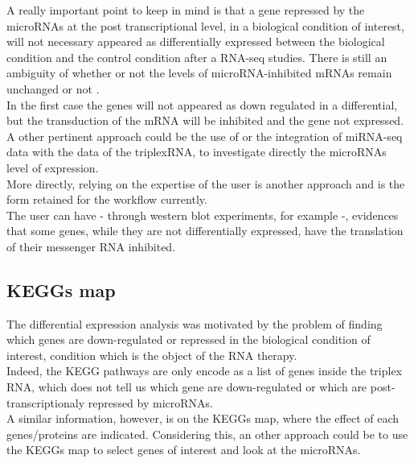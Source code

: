 \documentclass[a4paper,12pt]{report}
\begin{document}
A really important point to keep in mind is that a gene repressed by the microRNAs at the post transcriptional level, in a biological condition of interest, will not necessary appeared as differentially expressed between the biological condition and the control condition after a RNA-seq studies. There is still an ambiguity of whether or not the levels of microRNA-inhibited mRNAs remain unchanged or not \cite{cancer}.\\

In the first case the genes will not appeared as down regulated in a differential, but the transduction of the mRNA will be inhibited and the gene not expressed.\\

A other pertinent approach could be the use of or the integration of miRNA-seq data with the data of the triplexRNA, to investigate directly the microRNAs level of expression.\\
 
More directly, relying on the expertise of the user is another approach and is the form retained for the workflow currently. \\

The user can have - through western blot experiments, for example -, evidences that some genes, while they are not differentially expressed, have the translation of their messenger RNA inhibited.\\

\subsection{KEGGs map}

The differential expression analysis was motivated by the problem of finding which genes are down-regulated or repressed in the biological condition of interest, condition which is the object of the RNA therapy.\\

Indeed, the KEGG pathways are only encode as a list of genes inside the triplex RNA, which does not tell us which gene are down-regulated or which are post-transcriptionaly repressed by microRNAs.\\

A similar information, however, is on the KEGGs map, where the effect of each genes/proteins are indicated. Considering this, an other approach could be to use the KEGGs map to select genes of interest and look at the microRNAs.\\
\end{document}

